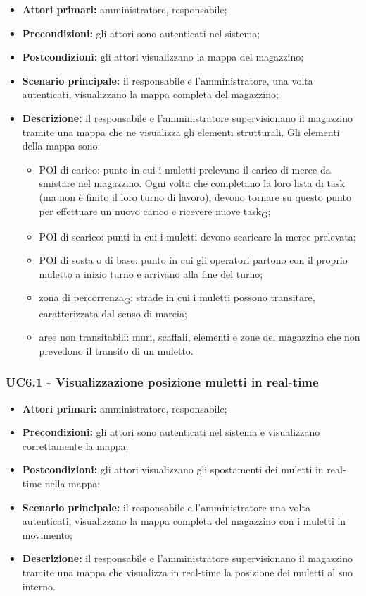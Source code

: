 \begin{itemize}
	\item 	\textbf{Attori primari:} amministratore, responsabile;
	\item 	\textbf{Precondizioni:} gli attori sono autenticati nel sistema;
	\item 	\textbf{Postcondizioni:} gli attori visualizzano la mappa del magazzino;
	\item 	\textbf{Scenario principale:} il responsabile e l'amministratore, una volta autenticati, visualizzano la mappa completa del magazzino;
	\item 	\textbf{Descrizione:} il responsabile e l'amministratore supervisionano il magazzino tramite una mappa che ne visualizza gli elementi strutturali. Gli elementi della mappa sono:
	\begin{itemize}
		\item POI di carico:  punto in cui i muletti prelevano il carico di merce da smistare nel magazzino. Ogni volta che completano la loro lista di task (ma non è finito il loro turno di lavoro), devono tornare su questo punto per effettuare un nuovo carico e ricevere nuove task\textsubscript{G};
		\item POI di scarico: punti in cui i muletti devono scaricare la merce prelevata;
		\item POI di sosta o di base: punto in cui gli operatori partono con il proprio muletto a inizio turno e arrivano alla fine del turno;
		\item zona di percorrenza\textsubscript{G}: strade in cui i muletti possono transitare, caratterizzata dal senso di marcia;
		\item aree non transitabili: muri, scaffali, elementi e zone del magazzino che non prevedono il transito di un muletto.
	\end{itemize}

\end{itemize}


\subsubsection{UC6.1 - Visualizzazione posizione muletti in real-time}
\begin{itemize}
	\item 	\textbf{Attori primari:} amministratore, responsabile;
	\item 	\textbf{Precondizioni:} gli attori sono autenticati nel sistema e visualizzano correttamente la mappa;
	\item 	\textbf{Postcondizioni:} gli attori visualizzano gli spostamenti dei muletti in real-time nella mappa;
	\item 	\textbf{Scenario principale:} il responsabile e l'amministratore una volta autenticati, visualizzano la mappa completa del magazzino con i muletti in movimento;
	\item 	\textbf{Descrizione:} il responsabile e l'amministratore supervisionano il magazzino tramite una mappa che visualizza in real-time la posizione dei muletti al suo interno.
\end{itemize}

